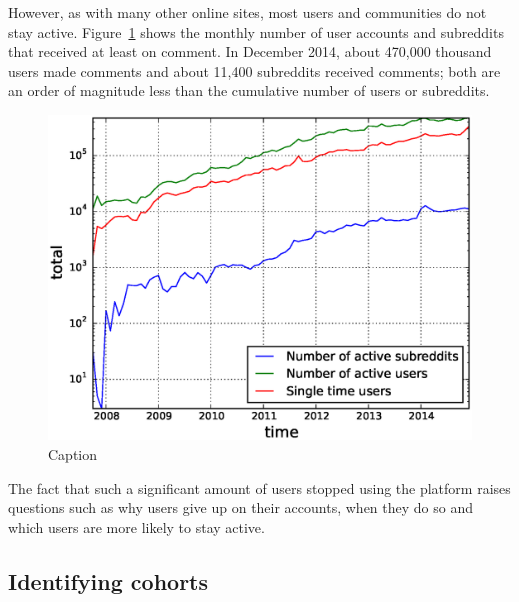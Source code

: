 However, as with many other online sites, most users \cite{} and communities \cite{butler/kraut paper} do not stay active.  Figure~\ref{fig:active_users_subreddits} shows the monthly number of user accounts and subreddits that received at least on comment.  In December 2014, about 470,000 thousand users made comments and about 11,400 subreddits received comments; both are an order of magnitude less than the cumulative number of users or subreddits.  

\begin{figure}[!tb]
\centering
\includegraphics[scale=0.4]{./images/active_users_subreddits.eps}
\caption{Caption}
\label{fig:active_users_subreddits}
\end{figure}


The fact that such a significant amount of users stopped using the platform raises questions such as why users give up on their accounts, when they do so and which users are more likely to stay active. 

\subsection{Identifying cohorts}
